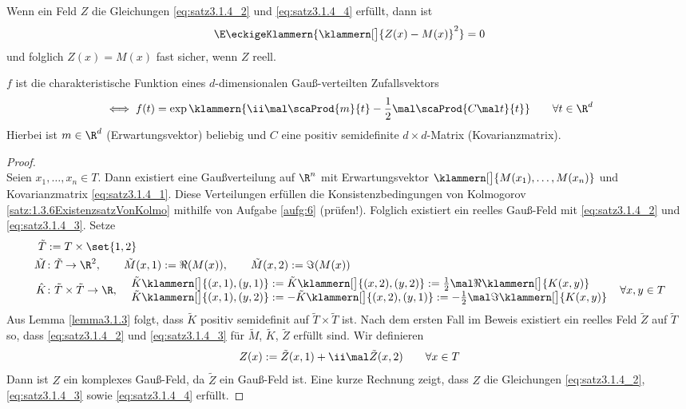 \begin{bemerkung}
	Wenn ein Feld $Z$ die Gleichungen \eqref{eq:satz3.1.4_2} und \eqref{eq:satz3.1.4_4} erfüllt, dann ist
	\begin{align*}
		\E\eckigeKlammern{\klammern[\big]{Z(x)-M(x)}^2}=0
	\end{align*}
	und folglich $Z(x)=M(x)$ fast sicher, wenn $Z$ reell.
\end{bemerkung}

\begin{erinnerung}
	$f$ ist die charakteristische Funktion eines $d$-dimensionalen Gauß-verteilten Zufallsvektors
	\begin{align*}
		\iff f(t)=\exp\klammern{\ii\mal\scaProd{m}{t}-\frac{1}{2}\mal\scaProd{C\mal t}{t}}\qquad\forall t\in\R^d
	\end{align*}
	Hierbei ist $m\in\R^d$ (Erwartungsvektor) beliebig und $C$ eine positiv semidefinite $d\times d$-Matrix (Kovarianzmatrix).
\end{erinnerung}

\begin{proof}
	\\
	Seien $x_1,\ldots,x_n\in T$.
	Dann existiert eine Gaußverteilung auf $\R^n$ mit Erwartungsvektor
	$\klammern[\big]{M(x_1),\ldots,M(x_n)}$ und Kovarianzmatrix \eqref{eq:satz3.1.4_1}.
	Diese Verteilungen erfüllen die Konsistenzbedingungen von Kolmogorov 
	\ref{satz:1.3.6ExistenzsatzVonKolmo} mithilfe von Aufgabe \ref{aufg:6} (prüfen!).
	Folglich existiert ein reelles Gauß-Feld mit \eqref{eq:satz3.1.4_2} und \eqref{eq:satz3.1.4_3}.\nl
	Setze
	\begin{align*}
		\tilde{T}&:=T\times\set{1,2}\\
		\tilde{M}&\colon\tilde{T}\to\R^2,\qquad
		\tilde{M}(x,1):=\Re(M(x)),\qquad
		\tilde{M}(x,2):=\Im(M(x))\\
		\hat{K}&\colon\tilde{T}\times\tilde{T}\to\R,~~
		\begin{array}{l}
			\tilde{K}\klammern[\big]{(x,1),(y,1)}:=
			\tilde{K}\klammern[\big]{(x,2),(y,2)}:=
			\frac{1}{2}\mal\Re\klammern[\big]{K(x,y)}\\
			\tilde{K}\klammern[\big]{(x,1),(y,2)}:=
			-\tilde{K}\klammern[\big]{(x,2),(y,1)}:=
			-\frac{1}{2}\mal\Im\klammern[\big]{K(x,y)}\\
		\end{array}~~\forall x,y\in T
	\end{align*}
	Aus Lemma \ref{lemma3.1.3} folgt, dass $\tilde{K}$ positiv semidefinit auf $\tilde{T}\times\tilde{T}$ ist.
	Nach dem ersten Fall im Beweis existiert ein reelles Feld $\tilde{Z}$ auf $\tilde{T}$ so, dass \eqref{eq:satz3.1.4_2} und \eqref{eq:satz3.1.4_3} für $\tilde{M}$, $\tilde{K}$, $\tilde{Z}$ erfüllt sind.
	Wir definieren
	\begin{align*}
		Z(x):=\tilde{Z}(x,1)+\ii\mal\tilde{Z}(x,2)\qquad\forall x\in T
	\end{align*}
	Dann ist $Z$ ein komplexes Gauß-Feld, da $\tilde{Z}$ ein Gauß-Feld ist.
	Eine kurze Rechnung zeigt, dass $Z$ die Gleichungen 
	\eqref{eq:satz3.1.4_2}, \eqref{eq:satz3.1.4_3} sowie \eqref{eq:satz3.1.4_4} erfüllt.
\end{proof}

